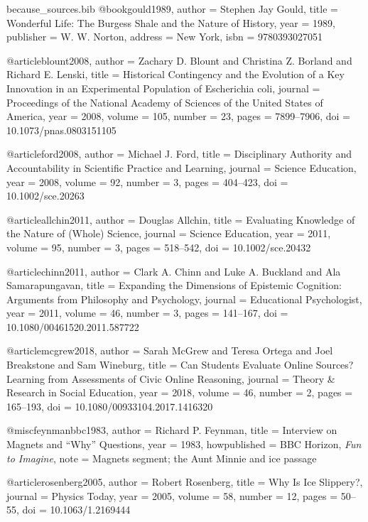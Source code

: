 \begin{filecontents*}{because_sources.bib}
@book{gould1989,
  author    = {Stephen Jay Gould},
  title     = {Wonderful Life: The Burgess Shale and the Nature of History},
  year      = {1989},
  publisher = {W. W. Norton},
  address   = {New York},
  isbn      = {9780393027051}
}

@article{blount2008,
  author  = {Zachary D. Blount and Christina Z. Borland and Richard E. Lenski},
  title   = {Historical Contingency and the Evolution of a Key Innovation in an Experimental Population of {Escherichia coli}},
  journal = {Proceedings of the National Academy of Sciences of the United States of America},
  year    = {2008},
  volume  = {105},
  number  = {23},
  pages   = {7899--7906},
  doi     = {10.1073/pnas.0803151105}
}

@article{ford2008,
  author  = {Michael J. Ford},
  title   = {Disciplinary Authority and Accountability in Scientific Practice and Learning},
  journal = {Science Education},
  year    = {2008},
  volume  = {92},
  number  = {3},
  pages   = {404--423},
  doi     = {10.1002/sce.20263}
}

@article{allchin2011,
  author  = {Douglas Allchin},
  title   = {Evaluating Knowledge of the Nature of (Whole) Science},
  journal = {Science Education},
  year    = {2011},
  volume  = {95},
  number  = {3},
  pages   = {518--542},
  doi     = {10.1002/sce.20432}
}

@article{chinn2011,
  author  = {Clark A. Chinn and Luke A. Buckland and Ala Samarapungavan},
  title   = {Expanding the Dimensions of Epistemic Cognition: Arguments from Philosophy and Psychology},
  journal = {Educational Psychologist},
  year    = {2011},
  volume  = {46},
  number  = {3},
  pages   = {141--167},
  doi     = {10.1080/00461520.2011.587722}
}

@article{mcgrew2018,
  author  = {Sarah McGrew and Teresa Ortega and Joel Breakstone and Sam Wineburg},
  title   = {Can Students Evaluate Online Sources? Learning from Assessments of Civic Online Reasoning},
  journal = {Theory \& Research in Social Education},
  year    = {2018},
  volume  = {46},
  number  = {2},
  pages   = {165--193},
  doi     = {10.1080/00933104.2017.1416320}
}

@misc{feynmanbbc1983,
  author       = {Richard P. Feynman},
  title        = {Interview on Magnets and ``Why'' Questions},
  year         = {1983},
  howpublished = {BBC Horizon, \emph{Fun to Imagine}},
  note         = {Magnets segment; the Aunt Minnie and ice passage}
}

@article{rosenberg2005,
  author  = {Robert Rosenberg},
  title   = {Why Is Ice Slippery?},
  journal = {Physics Today},
  year    = {2005},
  volume  = {58},
  number  = {12},
  pages   = {50--55},
  doi     = {10.1063/1.2169444}
}


\end{filecontents*}
